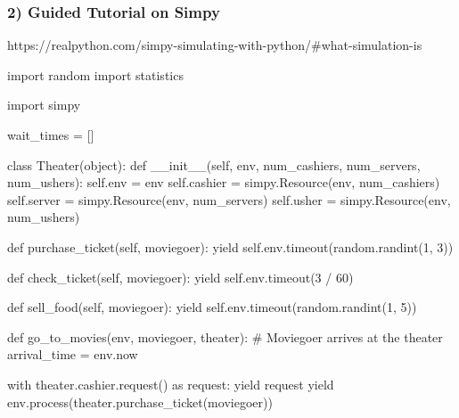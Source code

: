 \documentclass[
  11pt,
]{article}
\newenvironment{Shaded}{\begin{snugshade}}{\end{snugshade}}
\newcommand{\BuiltInTok}[1]{\textcolor[rgb]{0.00,0.23,0.31}{#1}}
\newcommand{\CommentTok}[1]{\textcolor[rgb]{0.37,0.37,0.37}{#1}}
\newcommand{\ControlFlowTok}[1]{\textcolor[rgb]{0.00,0.23,0.31}{#1}}
\newcommand{\DecValTok}[1]{\textcolor[rgb]{0.68,0.00,0.00}{#1}}
\newcommand{\FunctionTok}[1]{\textcolor[rgb]{0.28,0.35,0.67}{#1}}
\newcommand{\ImportTok}[1]{\textcolor[rgb]{0.00,0.46,0.62}{#1}}
\newcommand{\KeywordTok}[1]{\textcolor[rgb]{0.00,0.23,0.31}{#1}}
\newcommand{\NormalTok}[1]{\textcolor[rgb]{0.00,0.23,0.31}{#1}}
\newcommand{\OperatorTok}[1]{\textcolor[rgb]{0.37,0.37,0.37}{#1}}
\newcommand{\VariableTok}[1]{\textcolor[rgb]{0.07,0.07,0.07}{#1}}
\begin{document}
\subsubsection{2) Guided Tutorial on
Simpy}\label{guided-tutorial-on-simpy}

https://realpython.com/simpy-simulating-with-python/\#what-simulation-is

\begin{Shaded}
\begin{Highlighting}[]
\ImportTok{import}\NormalTok{ random}
\ImportTok{import}\NormalTok{ statistics}

\ImportTok{import}\NormalTok{ simpy}

\NormalTok{wait\_times }\OperatorTok{=}\NormalTok{ []}


\KeywordTok{class}\NormalTok{ Theater(}\BuiltInTok{object}\NormalTok{):}
    \KeywordTok{def} \FunctionTok{\_\_init\_\_}\NormalTok{(}\VariableTok{self}\NormalTok{, env, num\_cashiers, num\_servers, num\_ushers):}
        \VariableTok{self}\NormalTok{.env }\OperatorTok{=}\NormalTok{ env}
        \VariableTok{self}\NormalTok{.cashier }\OperatorTok{=}\NormalTok{ simpy.Resource(env, num\_cashiers)}
        \VariableTok{self}\NormalTok{.server }\OperatorTok{=}\NormalTok{ simpy.Resource(env, num\_servers)}
        \VariableTok{self}\NormalTok{.usher }\OperatorTok{=}\NormalTok{ simpy.Resource(env, num\_ushers)}

    \KeywordTok{def}\NormalTok{ purchase\_ticket(}\VariableTok{self}\NormalTok{, moviegoer):}
        \ControlFlowTok{yield} \VariableTok{self}\NormalTok{.env.timeout(random.randint(}\DecValTok{1}\NormalTok{, }\DecValTok{3}\NormalTok{))}

    \KeywordTok{def}\NormalTok{ check\_ticket(}\VariableTok{self}\NormalTok{, moviegoer):}
        \ControlFlowTok{yield} \VariableTok{self}\NormalTok{.env.timeout(}\DecValTok{3} \OperatorTok{/} \DecValTok{60}\NormalTok{)}

    \KeywordTok{def}\NormalTok{ sell\_food(}\VariableTok{self}\NormalTok{, moviegoer):}
        \ControlFlowTok{yield} \VariableTok{self}\NormalTok{.env.timeout(random.randint(}\DecValTok{1}\NormalTok{, }\DecValTok{5}\NormalTok{))}


\KeywordTok{def}\NormalTok{ go\_to\_movies(env, moviegoer, theater):}
    \CommentTok{\# Moviegoer arrives at the theater}
\NormalTok{    arrival\_time }\OperatorTok{=}\NormalTok{ env.now}

    \ControlFlowTok{with}\NormalTok{ theater.cashier.request() }\ImportTok{as}\NormalTok{ request:}
        \ControlFlowTok{yield}\NormalTok{ request}
        \ControlFlowTok{yield}\NormalTok{ env.process(theater.purchase\_ticket(moviegoer))}


\end{Highlighting}
\end{Shaded}
\end{document}
